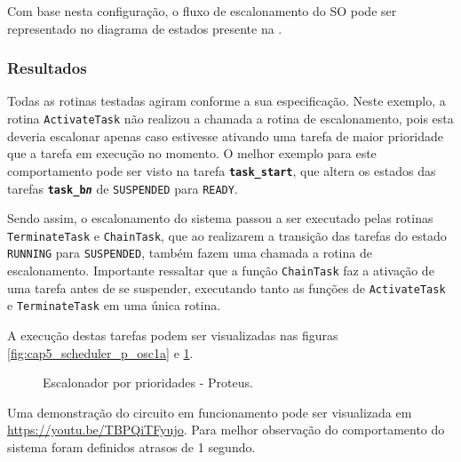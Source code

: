 Com base nesta configuração, o fluxo de escalonamento do SO pode ser representado no diagrama de estados presente na .


\subsubsection{Resultados}

Todas as rotinas testadas agiram conforme a sua especificação. Neste exemplo, a rotina \texttt{ActivateTask} não realizou a chamada a rotina de escalonamento, pois esta deveria escalonar apenas caso estivesse ativando uma tarefa de maior prioridade que a tarefa em execução no momento. O melhor exemplo para este comportamento pode ser visto na tarefa \textbf{\texttt{task\_start}}, que altera os estados das tarefas \textbf{\texttt{task\_b\textit{n}}} de \texttt{SUSPENDED} para \texttt{READY}.

Sendo assim, o escalonamento do sistema passou a ser executado pelas rotinas \texttt{TerminateTask} e \texttt{ChainTask}, que ao realizarem a transição das tarefas do estado \texttt{RUNNING} para \texttt{SUSPENDED}, também fazem uma chamada a rotina de escalonamento. Importante ressaltar que a função \texttt{ChainTask} faz a ativação de uma tarefa antes de se suspender, executando tanto as funções de \texttt{ActivateTask} e \texttt{TerminateTask} em uma única rotina.

A execução destas tarefas podem ser visualizadas nas figuras \ref{fig:cap5_scheduler_p_osc1a} e \ref{fig:cap5_scheduler_p_pro1}.


\begin{figure}[htb]
	\centering
	\caption{Escalonador por prioridades - Proteus.}
	\label{fig:cap5_scheduler_p_pro1}
\end{figure}

Uma demonstração do circuito em funcionamento pode ser visualizada em \url{https://youtu.be/TBPQiTFyujo}. Para melhor observação do comportamento do sistema foram definidos atrasos de 1 segundo.

